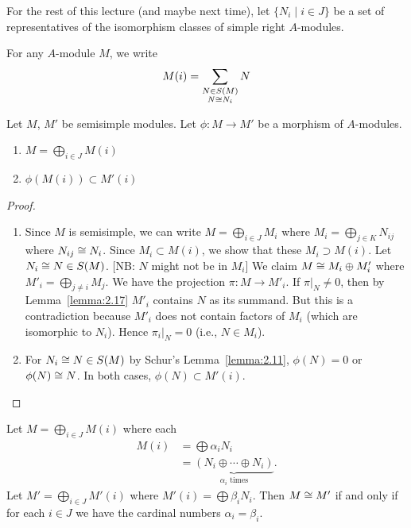 
\lecture{}
\begin{node}
For the rest of this lecture (and maybe next time), let $\{N_{i}\mid i\in J\}$
be a set of representatives of the isomorphism classes of simple right $A$-modules.
\end{node}

\begin{node}
For any $A$-module $M$, we write
\begin{equation*}
M(i)=\sum_{\substack{N\in S(M)\\N\cong N_{i}}}N
\end{equation*}
\end{node}

\begin{lemma}\label{lemma:2.18}
Let $M$, $M'$ be semisimple modules. Let $\phi\colon M\to M'$ be a
morphism of $A$-modules.
\begin{enumerate}
\item $M=\bigoplus_{i\in J}M(i)$
\item $\phi(M(i))\subset M'(i)$
\end{enumerate}
\end{lemma}

\begin{proof}
\begin{enumerate}
\item Since $M$ is semisimple, we can write $M=\bigoplus_{i\in J}M_{i}$
where $M_{i}=\bigoplus_{j\in K}N_{ij}$ where $N_{ij}\cong N_{i}$. Since
$M_{i}\subset M(i)$, we show that these $M_{i}\supset M(i)$. Let
$N_{i}\cong N\in S(M)$. [NB: $N$ might not be in $M_{i}$] We claim
$M\cong M_{i}\oplus M'_{i}$ where $M'_{i}=\bigoplus_{j\neq i}M_{j}$. We
have the projection $\pi\colon M\to M'_{i}$. If $\pi|_{N}\neq0$, then
by Lemma~\ref{lemma:2.17} $M'_{i}$ contains $N$ as its summand. But
this is a contradiction because $M'_{i}$ does not contain factors of
$M_{i}$ (which are isomorphic to $N_{i}$). Hence $\pi_{i}|_{N}=0$
(i.e., $N\in M_{i}$).
\item For $N_{i}\cong N\in S(M)$ by Schur's Lemma~\ref{lemma:2.11},
  $\phi(N)=0$ or $\phi(N)\cong N$. In both cases, $\phi(N)\subset M'(i)$.\qedhere
\end{enumerate}
\end{proof}

\begin{proposition}\label{prop:2.19}
Let $M=\bigoplus_{i\in J}M(i)$ where each
\begin{subequations}
  \begin{align}
M(i) &= \bigoplus\alpha_{i}N_{i}\\
&=\underbrace{(N_{i}\oplus\cdots\oplus N_{i})}_{\alpha_{i}\text{ times}}.
  \end{align}
\end{subequations}
Let $M'=\bigoplus_{i\in J}M'(i)$ where $M'(i)=\bigoplus\beta_{i}N_{i}$.
Then $M\cong M'$ if and only if for each $i\in J$ we have the cardinal numbers $\alpha_{i}=\beta_{i}$.
\end{proposition}

